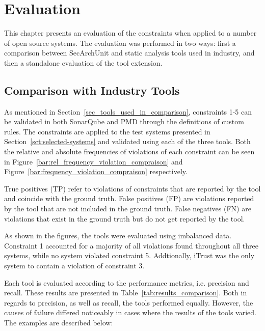 \chapter{Evaluation}

This chapter presents an evaluation of the constraints when applied to a number of open source systems. The evaluation was performed in two ways: first a comparison between SecArchUnit and static analysis tools used in industry, and then a standalone evaluation of the tool extension.

\section{Comparison with Industry Tools}
As mentioned in Section~\ref{sec_tools_used_in_comparison}, constraints 1-5 can be validated in both SonarQube and PMD through the definitions of custom rules. The constraints are applied to the test systems presented in Section~\ref{sct:selected-systems} and validated using each of the three tools. Both the relative and absolute frequencies of violations of each constraint can be seen in Figure~\ref{bar:rel_frequency_violation_compraison} and Figure~\ref{bar:frequency_violation_compraison} respectively.

True positives (TP) refer to violations of constraints that are reported by the tool and coincide with the ground truth. False positives (FP) are violations reported by the tool that are not included in the ground truth. False negatives (FN) are violations that exist in the ground truth but do not get reported by the tool.




As shown in the figures, the tools were evaluated using imbalanced data. Constraint 1 accounted for a majority of all violations found throughout all three systems, while no system violated constraint 5. Addtionally, iTrust was the only system to contain a violation of constraint 3. 

Each tool is evaluated according to the performance metrics, i.e. precision and recall. These results are presented in Table~\ref{tab:results_comparison}. Both in regards to precision, as well as recall, the tools performed equally. However, the causes of failure differed noticeably in cases where the results of the tools varied. The examples are described below:

